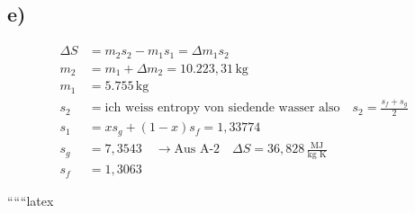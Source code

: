 

\subsection*{e)}
\begin{align*}
\Delta S &= m_2 s_2 - m_1 s_1 = \Delta m_1 s_2 \\
m_2 &= m_1 + \Delta m_2 = 10.223,31 \, \text{kg} \\
m_1 &= 5.755 \, \text{kg} \\
s_2 &= \text{ich weiss entropy von siedende wasser also} \quad s_2 = \frac{s_f + s_g}{2} \\
s_1 &= x s_g + (1 - x) s_f = 1,33774 \\
s_g &= 7,3543 \quad \rightarrow \text{Aus A-2} \quad \Delta S = 36,828 \, \frac{\text{MJ}}{\text{kg K}} \\
s_f &= 1,3063
\end{align*}

``````latex
